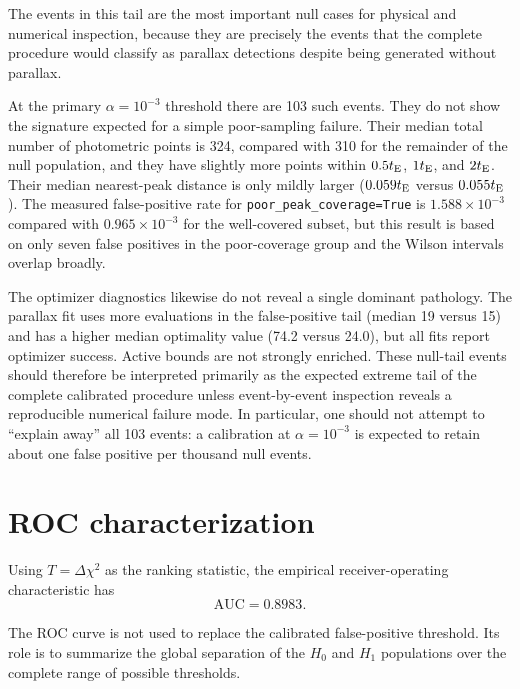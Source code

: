 \documentclass[11pt,a4paper]{article}
\newcommand{\dchi}{\Delta\chi^2}
\newcommand{\te}{t_{\rm E}}
\newcommand{\Hnull}{H_0}
\newcommand{\Halt}{H_1}
\begin{document}
The events in this tail are the most important null cases for physical and numerical
inspection, because they are precisely the events that the complete procedure would classify
as parallax detections despite being generated without parallax.

At the primary $\alpha=10^{-3}$ threshold there are 103 such events. They do not show the
signature expected for a simple poor-sampling failure. Their median total number of photometric
points is 324, compared with 310 for the remainder of the null population, and they have
slightly more points within $0.5\te$, $1\te$, and $2\te$. Their median nearest-peak distance is
only mildly larger ($0.059\te$ versus $0.055\te$). The measured false-positive rate for
\texttt{poor\_peak\_coverage=True} is $1.588\times10^{-3}$ compared with
$0.965\times10^{-3}$ for the well-covered subset, but this result is based on only seven false
positives in the poor-coverage group and the Wilson intervals overlap broadly.

The optimizer diagnostics likewise do not reveal a single dominant pathology. The parallax fit
uses more evaluations in the false-positive tail (median 19 versus 15) and has a higher median
optimality value (74.2 versus 24.0), but all fits report optimizer success. Active bounds are
not strongly enriched. These null-tail events should therefore be interpreted primarily as the
expected extreme tail of the complete calibrated procedure unless event-by-event inspection
reveals a reproducible numerical failure mode. In particular, one should not attempt to
``explain away'' all 103 events: a calibration at $\alpha=10^{-3}$ is expected to retain about
one false positive per thousand null events.

\section{ROC characterization}

Using $T=\dchi$ as the ranking statistic, the empirical receiver-operating characteristic has
\begin{equation}
    \mathrm{AUC}=0.8983.
\end{equation}

The ROC curve is not used to replace the calibrated false-positive threshold. Its role is to
summarize the global separation of the $\Hnull$ and $\Halt$ populations over the complete
range of possible thresholds.
\end{document}
